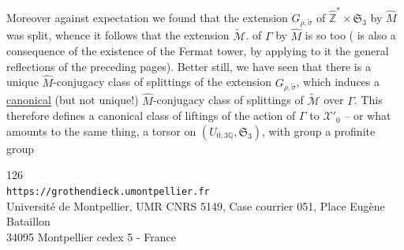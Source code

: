 Moreover against  expectation we found that the extension $G_{\rho,\widetilde\sigma}$ of $\widehat{\mathbb Z}^{*}\times\mathfrak S_3$ by $\widehat M$ was split, whence it follows that  the extension $\widetilde{\mathcal M}$. of $\Gamma$ by $\widehat M$ is so too (  is also a consequence of the existence of the Fermat tower, by applying to it the general reflections of the preceding pages). Better still, we have seen that there is a unique $\widehat M$-conjugacy class of splittings of the extension $G_{\rho,\widetilde\sigma}$, which induces a \uline{canonical} (but not unique!) $\widehat M$-conjugacy class of  splittings of $\widetilde{\mathcal M}$ over $\Gamma$. This therefore defines a canonical  class of liftings of the action of $\Gamma$  to $\mathcal X'_0$ -- or what amounts to the same thing, a torsor on $(U_{0,3\mathbb Q},\mathfrak S_3)$, with group a profinite group



\begin{center}
\small
126\\
\texttt{https://grothendieck.umontpellier.fr}\\
Université de Montpellier, UMR CNRS 5149, Case courrier 051, Place Eugène Bataillon\\
34095 Montpellier cedex 5 - France
\end{center}